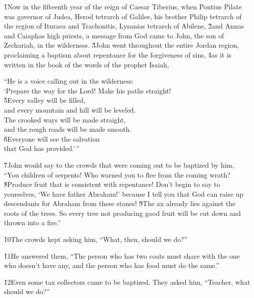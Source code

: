 \v{1}Now in the fifteenth year of the reign of Caesar Tiberius, when Pontius Pilate was governor of Judea, Herod tetrarch of Galilee, his brother Philip tetrarch of the region of Ituraea and Trachonitis, Lysanias tetrarch of Abilene, \v{2}and Annas and Caiaphas high priests, a message from God came to John, the son of Zechariah, in the wilderness. \v{3}John went throughout the entire Jordan region, proclaiming a baptism about repentance for the forgiveness of sins, \v{4}as it is written in the book of the words of the prophet Isaiah,

\begin{poetry}
\poeml ``He is a voice calling out in the wilderness: \\
\poemll    `Prepare the way for the Lord! Make his paths straight! \\
\poeml \v{5}Every valley will be filled, \\
\poemll    and every mountain and hill will be leveled. \\
\poeml The crooked ways will be made straight, \\
\poemll    and the rough roads will be made smooth. \\
\poeml \v{6}Everyone will see the salvation \\
\poemll    that God has provided.'\,''
\end{poetry}

\v{7}John would say to the crowds that were coming out to be baptized by him, ``You children of serpents! Who warned you to flee from the coming wrath? \v{8}Produce fruit that is consistent with repentance! Don't begin to say to yourselves, `We have father Abraham!' because I tell you that God can raise up descendants for Abraham from these stones! \v{9}The ax already lies against the roots of the trees. So every tree not producing good fruit will be cut down and thrown into a fire.''

\v{10}The crowds kept asking him, ``What, then, should we do?''

\v{11}He answered them, ``The person who has two coats must share with the one who doesn't have any, and the person who has food must do the same.''

\v{12}Even some tax collectors came to be baptized. They asked him, ``Teacher, what should we do?''

